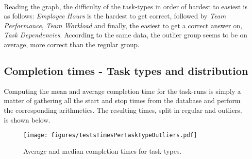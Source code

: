      \\


    Reading the graph, the difficulty of the task-types in order of hardest
    to easiest is as follows: \textit{Employee Hours} is the hardest to get
    correct, followed by \textit{Team Performance}, \textit{Team Workload}
    and finally, the easiest to get a correct answer on, \textit{Task
      Dependencies}. According to the same data, the outlier group seems to
    be on average, more correct than the regular group.



%
  \subsection{Completion times - Task types and distribution}

    Computing the mean and average completion time for the task-runs is
    simply a matter of gathering all the start and stop times from the
    database and perform the corresponding arithmetics. The resulting times,
    split in regular and outliers, is shown below.

    \begin{figure}[h!]
      \centering
      \texttt{[image: figures/testsTimesPerTaskTypeOutliers.pdf]}
      \caption{Average and median completion times for task-types. }
      \label{label_testsTimesPerTaskTypeOutliers}
    \end{figure}



